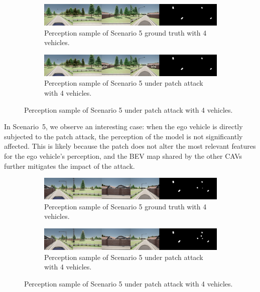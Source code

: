 \begin{figure}[H]
    \centering
    \begin{subfigure}[b]{1\textwidth}
        \centering
        \includegraphics[width=\textwidth]{figures/results/scenario5noeffectgt.png}
        \caption{Perception sample of Scenario 5 ground truth with 4 vehicles.}
        \label{fig:scenario5_gt4vh}
    \end{subfigure}
    \vspace{0.5cm}
    \begin{subfigure}[b]{1\textwidth}
        \centering
        \includegraphics[width=\textwidth]{figures/results/scenario5noeffect.png}
        \caption{Perception sample of Scenario 5 under patch attack with 4 vehicles.}
        \label{fig:scenario5_4vh}
    \end{subfigure}
\end{figure}

In Scenario~5, we observe an interesting case: when the ego vehicle is directly subjected to the patch attack, the perception of the model is not significantly affected. This is likely because the patch does not alter the most relevant features for the ego vehicle’s perception, and the BEV map shared by the other CAVs further mitigates the impact of the attack.

\begin{figure}[H]
    \centering
    \begin{subfigure}[b]{1\textwidth}
        \centering
        \includegraphics[width=\textwidth]{figures/results/scenario5gt.png}
        \caption{Perception sample of Scenario 5 ground truth with 4 vehicles.}
        \label{fig:scenario5_gt4vh_effect}
    \end{subfigure}
    \vspace{0.5cm}
    \begin{subfigure}[b]{1\textwidth}
        \centering
        \includegraphics[width=\textwidth]{figures/results/scenario5.png}
        \caption{Perception sample of Scenario 5 under patch attack with 4 vehicles.}
        \label{fig:scenario5_4vh_effect}
    \end{subfigure}
\end{figure}

